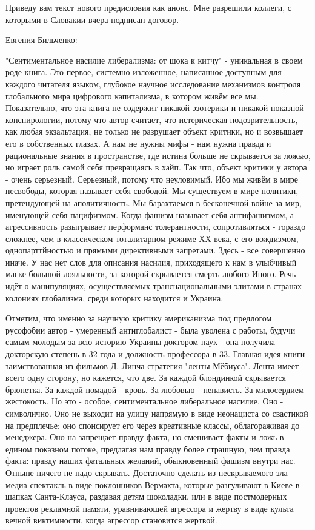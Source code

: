 Приведу вам текст нового предисловия как анонс. Мне разрешили коллеги, с
которыми в Словакии вчера подписан договор.

Евгения Бильченко:

"Сентиментальное насилие либерализма: от шока к китчу" - уникальная в своем
роде книга. Это первое, системно изложенное, написанное доступным для каждого
читателя языком, глубокое научное исследование механизмов контроля глобального
мира цифрового капитализма, в котором живём все мы. Показательно, что эта книга
не содержит никакой эзотерики и никакой показной конспирологии, потому что
автор считает, что истерическая подозрительность, как любая экзальтация, не
только не разрушает объект критики, но и возвышает его в собственных глазах. А
нам не нужны мифы - нам нужна правда и рациональные знания в пространстве, где
истина больше не скрывается за ложью, но играет роль самой себя превращаясь в
хайп. Так что, объект критики у автора - очень серьезный. Серьезный, потому что
неуловимый. Ибо мы живём в мире несвободы, которая называет себя свободой. Мы
существуем в мире политики, претендующей на аполитичность. Мы барахтаемся в
бесконечной войне за мир, именующей себя пацифизмом. Когда фашизм называет себя
антифашизмом, а агрессивность разыгрывает перформанс толерантности,
сопротивляться - гораздо сложнее, чем в классическом тоталитарном режиме ХХ
века, с его вождизмом, однопарттйностью и прямыми директивными запретами. Здесь
- все совершенно иначе. У нас нет слов для описания насилия, приходящего к нам
в улыбчивый маске большой лояльности, за которой скрывается смерть любого
Иного.  Речь идёт о манипуляциях, осуществляемых транснациональными элитами в
странах-колониях глобализма, среди которых находится и Украина. 

Отметим, что именно за научную критику американизма под предлогом русофобии
автор - умеренный антиглобалист - была уволена с работы, будучи самым молодым
за всю историю Украины доктором наук - она получила докторскую степень в 32
года и должность профессора в 33. Главная идея книги - заимствованная из
фильмов Д. Линча стратегия "ленты Мёбиуса". Лента имеет всего одну сторону, но
кажется, что две. За каждой блондинкой скрывается брюнетка. За каждой помадой -
кровь. За любовью - ненависть. За милосердием - жестокость. Но это - особое,
сентиментальное либеральное насилие. Оно - символично. Оно не выходит на улицу
напрямую в виде неонациста со свастикой на предплечье: оно спонсирует его через
креативные классы, облагораживая до менеджера. Оно на запрещает правду факта,
но смешивает факты и ложь в едином показном потоке, предлагая нам правду более
страшную, чем правда факта: правду наших фатальных желаний, обыкновенный фашизм
внутри нас. Отныне ничего не надо скрывать. Достаточно сделать из нескрываемого
зла медиа-спектакль в виде поклонников Вермахта, которые разгуливают в Киеве в
шапках Санта-Клауса, раздавая детям шоколадки, или в виде постмодерных проектов
рекламной памяти, уравнивающей агрессора и жертву в виде культа вечной
виктимности, когда агрессор становится жертвой. 

